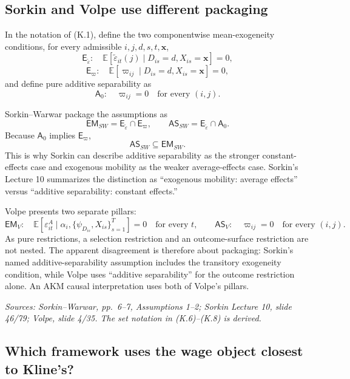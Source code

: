 \documentclass[11pt]{article}
\begin{document}
\subsection{Sorkin and Volpe use different packaging}

In the notation of (K.1), define the two componentwise mean-exogeneity
conditions, for every admissible \(i,j,d,s,t,\mathbf x\),
\[
\mathsf E_{\widetilde\varepsilon}:
\quad
\mathbb E[
\widetilde\varepsilon_{it}(j)
\mid D_{is}=d,X_{is}=\mathbf x]
=0,
\tag{K.3}
\]
\[
\mathsf E_{\varpi}:
\quad
\mathbb E[
\varpi_{ij}
\mid D_{is}=d,X_{is}=\mathbf x]
=0,
\tag{K.4}
\]
and define pure additive separability as
\[
\mathsf A_0:
\quad
\varpi_{ij}=0
\quad\text{for every }(i,j).
\tag{K.5}
\]

Sorkin--Warwar package the assumptions as
\[
\mathsf{EM}_{SW}
=
\mathsf E_{\widetilde\varepsilon}
\cap
\mathsf E_{\varpi},
\qquad
\mathsf{AS}_{SW}
=
\mathsf E_{\widetilde\varepsilon}
\cap
\mathsf A_0.
\tag{K.6}
\]
Because \(\mathsf A_0\) implies \(\mathsf E_{\varpi}\),
\[
\mathsf{AS}_{SW}\subseteq\mathsf{EM}_{SW}.
\tag{K.7}
\]
This is why Sorkin can describe additive separability as the stronger
constant-effects case and exogenous mobility as the weaker average-effects
case.  Sorkin's Lecture 10 summarizes the distinction as ``exogenous
mobility: average effects'' versus ``additive separability: constant
effects.''

Volpe presents two separate pillars:
\[
\mathsf{EM}_{V}:
\quad
\mathbb E\left[
\varepsilon^A_{it}
\mid
\alpha_i,\{\psi_{D_{is}},X_{is}\}_{s=1}^{T}
\right]=0
\quad\text{for every }t,
\qquad
\mathsf{AS}_{V}:
\quad
\varpi_{ij}=0
\quad\text{for every }(i,j).
\tag{K.8}
\]
As pure restrictions, a selection restriction and an outcome-surface
restriction are not nested.  The apparent disagreement is therefore about
packaging: Sorkin's named additive-separability assumption includes the
transitory exogeneity condition, while Volpe uses ``additive separability''
for the outcome restriction alone.  An AKM causal interpretation uses both
of Volpe's pillars.

\textit{Sources: Sorkin--Warwar, pp.\ 6--7, Assumptions 1--2; Sorkin
Lecture 10, slide 46/79; Volpe, slide 4/35.  The set notation in
(K.6)--(K.8) is derived.}

\subsection{Which framework uses the wage object closest to Kline's?}
\end{document}
